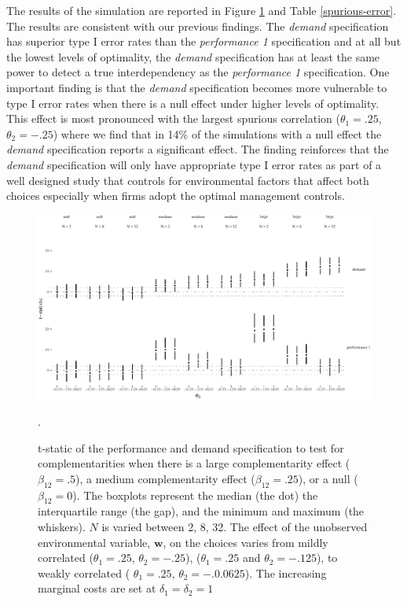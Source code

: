 \documentclass[12pt]{article}
\begin{document}
The results of the simulation are reported in Figure \ref{spurious} and
Table \ref{spurious-error}. The results are consistent with our previous
findings. The \emph{demand} specification has superior type I error
rates than the \emph{performance 1} specification and at all but the
lowest levels of optimality, the \emph{demand} specification has at
least the same power to detect a true interdependency as the
\emph{performance 1} specification. One important finding is that the
\emph{demand} specification becomes more vulnerable to type I error
rates when there is a null effect under higher levels of optimality.
This effect is most pronounced with the largest spurious correlation
(\(\theta_1 = .25\), \(\theta_2 = -.25\)) where we find that in 14\% of
the simulations with a null effect the \emph{demand} specification
reports a significant effect. The finding reinforces that the
\emph{demand} specification will only have appropriate type I error
rates as part of a well designed study that controls for environmental
factors that affect both choices especially when firms adopt the optimal
management controls.

\begin{figure}

\includegraphics[width=500px]{figure-latex/spurious-plot-1}
\caption[Error Rate and Power with Unobserved Environmental Variables]
{\label{spurious} t-static of the performance and demand specification to test
for complementarities when there is a large complementarity effect
($\beta_{12} = .5$), a medium complementarity effect ($\beta_{12} = .25$),
or a null ($\beta_{12} = 0$). The boxplots represent the median (the dot) the
interquartile range (the gap), and the minimum and maximum (the whiskers). $N$
is varied between 2, 8, 32. The effect of the unobserved environmental variable,
$\mathbf{w}$, on the choices varies from mildly correlated ($\theta_1 = .25$,
$\theta_2 = -.25$), ($\theta_1 = .25$ and $\theta_2 = -.125$),
to weakly correlated ( $\theta_1 =.25$, $\theta_2 = -.0.0625$). The increasing
marginal costs are set at $\delta_1 = \delta_2 = 1$}.
\end{figure}
\end{document}
